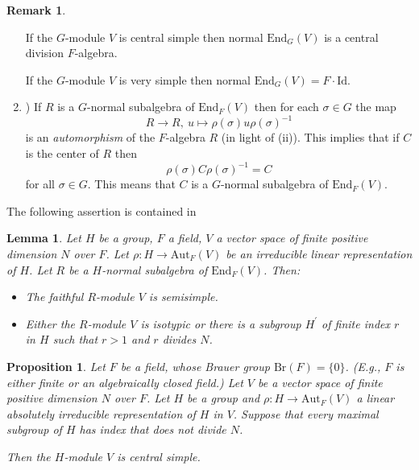 \documentclass[12pt,a4paper,reqno]{amsart}
\def\End{\mathrm{End}}
\def\Aut{\mathrm{Aut}}
\def\Id{\mathrm{Id}}
\newtheorem{lem}[thm]{Lemma}
\newtheorem{prop}[thm]{Proposition}
\theoremstyle{definition}
\newtheorem{rem}[thm]{Remark}
\begin{document}
\begin{rem}
\begin{enumerate}
 If the $G$-module $V$ is central simple then  normal $\End_G(V)$ is  a central division $F$-algebra.
 
  If the $G$-module $V$ is very simple then normal  $\End_G(V)=F \cdot \Id$.
  \item[(iv]) If $R$ is a $G$-normal subalgebra of $\End_F(V)$ then for each $\sigma\in G$ the map
  $$R \to R, \  u \mapsto \rho(\sigma)u \rho(\sigma)^{-1}$$
  is an {\sl automorphism} of the $F$-algebra $R$ (in light of (ii)).  This implies that if $C$ is the center of $R$ then
  $$\rho(\sigma)C \rho(\sigma)^{-1}=C$$
  for all $\sigma \in G$. This means that $C$ is a $G$-normal subalgebra of $\End_F(V)$.
 
 \end{enumerate}
 
\end{rem}

The following assertion is contained in \cite[Lemma 7.4]{ZarhinM}

\begin{lem}
\label{74}
Let $H$ be a group, $F$ a field, $V$ a vector space  of finite positive dimension $N$ over $F$.
Let $\rho: H \to \Aut_F(V)$ be an irreducible linear representation of $H$.  Let $R$ be a $H$-normal subalgebra of $\End_F(V)$. Then:
\begin{itemize}
\item[(i)]
The faithful $R$-module $V$ is semisimple.
\item[(ii)]
Either the $R$-module $V$ is isotypic or there is a subgroup $H^{\prime}$ of finite index $r$ in $H$ such that $r>1$ and $r$ divides $N$.
\end{itemize}
\end{lem}

\begin{prop}
\label{centralsimpleIndex}
Let $F$ be  a field, whose Brauer group $\mathrm{Br}(F)=\{0\}$. (E.g., $F$ is either finite or an algebraically closed field.)
Let $V$ be a vector space of finite positive dimension $N$ over $F$. Let $H$ be a group and
$\rho: H \to \Aut_F(V)$ a linear absolutely irreducible representation of $H$ in $V$. Suppose that 
every maximal subgroup of $H$ has index that does not divide $N$.


Then the $H$-module $V$ is central simple.  
\end{prop}
\end{document}
